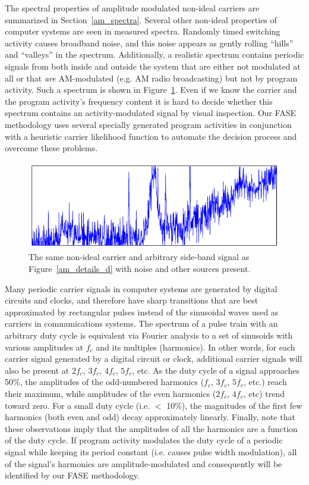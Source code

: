 The spectral properties of amplitude modulated non-ideal carriers are summarized in Section~\ref{am_spectra}. Several other non-ideal properties of computer systems are seen in measured spectra. Randomly timed switching activity causes broadband noise, and this noise appears as gently rolling ``hills'' and ``valleys'' in the spectrum. Additionally, a realistic spectrum contains periodic signals from both inside and outside the system that are either not modulated at all or that \emph{are} AM-modulated (e.g. AM radio broadcasting) but not by program activity. Such a spectrum is shown in Figure~\ref{am_details_e}. Even if we know the carrier and the program activity's frequency content it is hard to decide whether this spectrum contains an activity-modulated signal by visual inspection. Our FASE methodology uses several specially generated program activities in conjunction with a heuristic carrier likelihood
function to automate the decision process and overcome these problems.

\begin{figure}[thb]
  \centering
    \includegraphics[scale=.95]{../fase/Data/am_details_e.pdf}
  \caption{The same non-ideal carrier and arbitrary side-band signal as Figure~\ref{am_details_d} with noise and other sources present.}
  \label{am_details_e}
\end{figure}

Many periodic carrier signals in computer systems are generated by digital circuits and clocks, and therefore have sharp transitions that are best approximated by rectangular pulses instead of the sinusoidal waves used as carriers in communications systems. The spectrum of a pulse train with an arbitrary duty cycle is equivalent via Fourier analysis to a set of sinusoids with various amplitudes at $f_c$ and its multiples (harmonics). 
In other words, for each carrier signal generated by a digital circuit or clock, additional carrier signals will also be present at $2f_c$, $3f_c$, $4f_c$, $5f_c$, etc. As the duty cycle of a signal approaches 50\%, the amplitudes of the odd-numbered harmonics ($f_c$, $3f_c$, $5f_c$, etc.) reach their maximum, while amplitudes of the even harmonics ($2f_c$, $4f_c$, etc) trend toward zero. For a small duty cycle (i.e. $<$ 10\%), the magnitudes of the first few harmonics (both even and odd) decay approximately linearly. Finally, note that these observations imply that the amplitudes of all the harmonics are a function of the duty cycle. If program activity modulates the duty cycle of a periodic signal while keeping its period constant (i.e. causes pulse width modulation), all of the signal's harmonics are amplitude-modulated and consequently will be identified by our FASE methodology.

